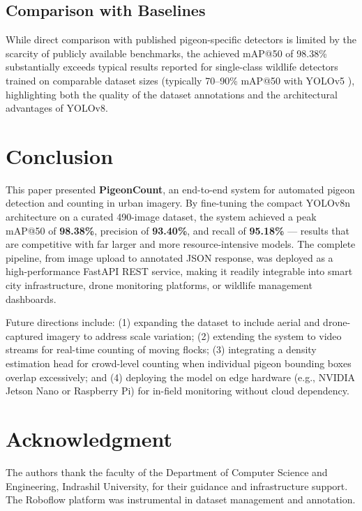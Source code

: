\documentclass[journal]{IEEEtran}
\begin{document}
\subsection{Comparison with Baselines}
While direct comparison with published pigeon-specific detectors is limited by the scarcity of publicly available benchmarks, the achieved mAP@50 of 98.38\% substantially exceeds typical results reported for single-class wildlife detectors trained on comparable dataset sizes (typically 70--90\% mAP@50 with YOLOv5 \cite{yolov5}), highlighting both the quality of the dataset annotations and the architectural advantages of YOLOv8.

\section{Conclusion}
\label{sec:conclusion}

This paper presented \textbf{PigeonCount}, an end-to-end system for automated pigeon detection and counting in urban imagery. By fine-tuning the compact YOLOv8n architecture on a curated 490-image dataset, the system achieved a peak mAP@50 of \textbf{98.38\%}, precision of \textbf{93.40\%}, and recall of \textbf{95.18\%} — results that are competitive with far larger and more resource-intensive models. The complete pipeline, from image upload to annotated JSON response, was deployed as a high-performance FastAPI REST service, making it readily integrable into smart city infrastructure, drone monitoring platforms, or wildlife management dashboards.

Future directions include: (1) expanding the dataset to include aerial and drone-captured imagery to address scale variation; (2) extending the system to video streams for real-time counting of moving flocks; (3) integrating a density estimation head for crowd-level counting when individual pigeon bounding boxes overlap excessively; and (4) deploying the model on edge hardware (e.g., NVIDIA Jetson Nano or Raspberry Pi) for in-field monitoring without cloud dependency.

\section*{Acknowledgment}
The authors thank the faculty of the Department of Computer Science and Engineering, Indrashil University, for their guidance and infrastructure support. The Roboflow platform was instrumental in dataset management and annotation.
\end{document}
